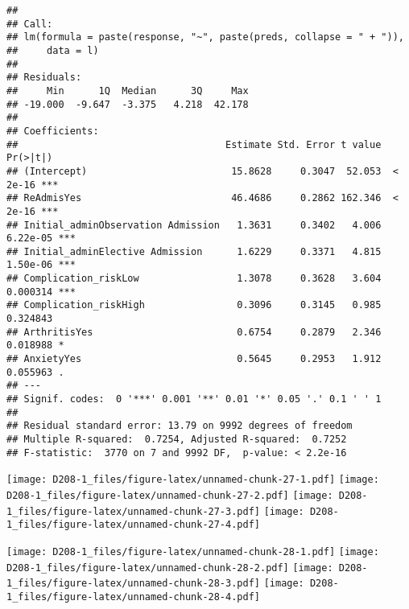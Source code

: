 \documentclass[
]{article}
\newenvironment{Shaded}{\begin{snugshade}}{\end{snugshade}}
\newcommand{\FunctionTok}[1]{\textcolor[rgb]{0.00,0.00,0.00}{#1}}
\newcommand{\NormalTok}[1]{#1}
\newcommand{\SpecialCharTok}[1]{\textcolor[rgb]{0.00,0.00,0.00}{#1}}
\begin{document}
\begin{verbatim}
## 
## Call:
## lm(formula = paste(response, "~", paste(preds, collapse = " + ")), 
##     data = l)
## 
## Residuals:
##     Min      1Q  Median      3Q     Max 
## -19.000  -9.647  -3.375   4.218  42.178 
## 
## Coefficients:
##                                    Estimate Std. Error t value Pr(>|t|)    
## (Intercept)                         15.8628     0.3047  52.053  < 2e-16 ***
## ReAdmisYes                          46.4686     0.2862 162.346  < 2e-16 ***
## Initial_adminObservation Admission   1.3631     0.3402   4.006 6.22e-05 ***
## Initial_adminElective Admission      1.6229     0.3371   4.815 1.50e-06 ***
## Complication_riskLow                 1.3078     0.3628   3.604 0.000314 ***
## Complication_riskHigh                0.3096     0.3145   0.985 0.324843    
## ArthritisYes                         0.6754     0.2879   2.346 0.018988 *  
## AnxietyYes                           0.5645     0.2953   1.912 0.055963 .  
## ---
## Signif. codes:  0 '***' 0.001 '**' 0.01 '*' 0.05 '.' 0.1 ' ' 1
## 
## Residual standard error: 13.79 on 9992 degrees of freedom
## Multiple R-squared:  0.7254, Adjusted R-squared:  0.7252 
## F-statistic:  3770 on 7 and 9992 DF,  p-value: < 2.2e-16
\end{verbatim}

\begin{Shaded}
\end{Shaded}

\texttt{[image: D208-1\_files/figure-latex/unnamed-chunk-27-1.pdf]}
\texttt{[image: D208-1\_files/figure-latex/unnamed-chunk-27-2.pdf]}
\texttt{[image: D208-1\_files/figure-latex/unnamed-chunk-27-3.pdf]}
\texttt{[image: D208-1\_files/figure-latex/unnamed-chunk-27-4.pdf]}

\begin{Shaded}
\end{Shaded}

\texttt{[image: D208-1\_files/figure-latex/unnamed-chunk-28-1.pdf]}
\texttt{[image: D208-1\_files/figure-latex/unnamed-chunk-28-2.pdf]}
\texttt{[image: D208-1\_files/figure-latex/unnamed-chunk-28-3.pdf]}
\texttt{[image: D208-1\_files/figure-latex/unnamed-chunk-28-4.pdf]}
\end{document}
